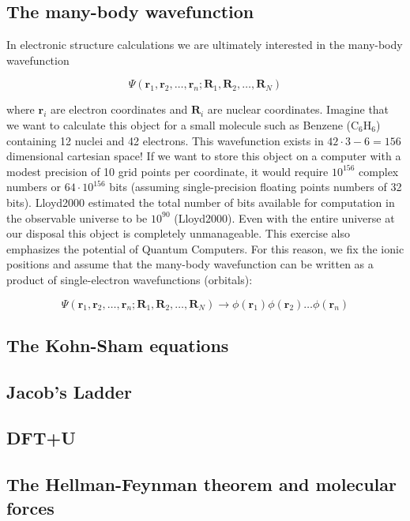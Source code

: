\subsection{The many-body wavefunction}
In electronic structure calculations we are ultimately interested in the many-body wavefunction

\[ \Psi(\bm{r}_1,\bm{r}_2,\dots, \bm{r}_n; \bm{R}_1, \bm{R}_2, \dots , \bm{R}_N) \]

\noindent where $\bm{r}_i$ are electron coordinates and $\bm{R}_i$ are nuclear coordinates. Imagine that we want to calculate this object for a small molecule such as Benzene (C$_6$H$_6$) containing 12 nuclei and 42 electrons. This wavefunction exists in $42\cdot3-6 = 156$ dimensional cartesian space! If we want to store this object on a computer with a modest precision of 10 grid points per coordinate, it would require $10^{156}$ complex numbers or $64 \cdot 10^{156}$ bits (assuming single-precision floating points numbers of 32 bits). Lloyd2000 estimated the total number of bits available for computation in the observable universe to be $10^{90}$ (Lloyd2000). Even with the entire universe at our disposal this object is completely unmanageable. This exercise also emphasizes the potential of Quantum Computers. For this reason, we fix the ionic positions and assume that the many-body wavefunction can be written as a product of single-electron wavefunctions (orbitals):

\[ \Psi(\bm{r}_1,\bm{r}_2,\dots, \bm{r}_n; \bm{R}_1, \bm{R}_2, \dots , \bm{R}_N) \longrightarrow \phi(\bm{r}_1)\phi(\bm{r}_2)\dots\phi(\bm{r}_n) \]

\subsection{The Kohn-Sham equations}

\subsection{Jacob's Ladder}

\subsection{DFT+U}\label{sec:ldau}

\subsection{The Hellman-Feynman theorem and molecular forces}

